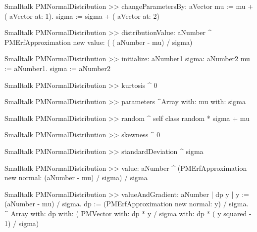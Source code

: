 \begin{displaycode}{Smalltalk}
PMNormalDistribution >> changeParametersBy: aVector
    mu := mu + ( aVector at: 1).
    sigma := sigma + ( aVector at: 2)
\end{displaycode}

\begin{displaycode}{Smalltalk}
PMNormalDistribution >> distributionValue: aNumber
    ^ PMErfApproximation new value: ( ( aNumber - mu) / sigma)
\end{displaycode}

\begin{displaycode}{Smalltalk}
PMNormalDistribution >> initialize: aNumber1 sigma: aNumber2
    mu := aNumber1.
    sigma := aNumber2
\end{displaycode}

\begin{displaycode}{Smalltalk}
PMNormalDistribution >> kurtosis
    ^ 0
\end{displaycode}

\begin{displaycode}{Smalltalk}
PMNormalDistribution >> parameters
    ^Array with: mu with: sigma
\end{displaycode}

\begin{displaycode}{Smalltalk}
PMNormalDistribution >> random
    ^ self class random * sigma + mu
\end{displaycode}

\begin{displaycode}{Smalltalk}
PMNormalDistribution >> skewness
    ^ 0
\end{displaycode}

\begin{displaycode}{Smalltalk}
PMNormalDistribution >> standardDeviation
    ^ sigma
\end{displaycode}

\begin{displaycode}{Smalltalk}
PMNormalDistribution >> value: aNumber
    ^ (PMErfApproximation new normal: (aNumber - mu) / sigma) / 
                                                                 sigma
\end{displaycode}

\begin{displaycode}{Smalltalk}
PMNormalDistribution >> valueAndGradient: aNumber
    | dp y |
    y := (aNumber - mu) / sigma.
    dp := (PMErfApproximation new normal: y) / sigma.
    ^ Array with: dp
           with: ( PMVector with: dp * y / sigma
                             with: dp * ( y squared - 1) / sigma)
\end{displaycode}

